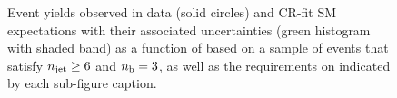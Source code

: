 \begin{figure}[h!]
\begin{center}
    \caption{Event yields observed in data (solid circles) and CR-fit SM expectations with their associated uncertainties (green histogram with shaded band) as a function of \HTmiss based on a sample of events that satisfy $n_{\text{jet}} \geq 6$ and $n_{\text{b}} = 3$, as well as the requirements on \scalht indicated by each sub-figure caption. }
    \label{fig:mhtval_ge6j_eq3b}
  \end{center}
\end{figure}
